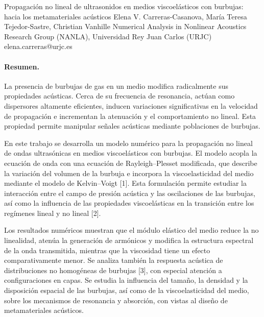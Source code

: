 \documentclass[11pt,a4paper]{article}
\begin{document}
\begin{sincabstract}
{Propagación no lineal de ultrasonidos en medios viscoelásticos con burbujas: hacia los metamateriales acústicos}
{Elena V. Carreras-Casanova, María Teresa Tejedor-Sastre, Christian Vanhille}
{Numerical Analysis in Nonlinear Acoustics Research Group (NANLA), Universidad Rey Juan Carlos (URJC)}
{elena.carreras@urjc.es}

\paragraph{Resumen.}
La presencia de burbujas de gas en un medio modifica radicalmente sus propiedades acústicas. Cerca de su frecuencia de resonancia, actúan como dispersores altamente eficientes, inducen variaciones significativas en la velocidad de propagación e incrementan la atenuación y el comportamiento no lineal. Esta propiedad permite manipular señales acústicas mediante poblaciones de burbujas.

En este trabajo se desarrolla un modelo numérico para la propagación no lineal de ondas ultrasónicas en medios viscoelásticos con burbujas. El modelo acopla la ecuación de onda con una ecuación de Rayleigh--Plesset modificada, que describe la variación del volumen de la burbuja e incorpora la viscoelasticidad del medio mediante el modelo de Kelvin--Voigt [1]. Esta formulación permite estudiar la interacción entre el campo de presión acústica y las oscilaciones de las burbujas, así como la influencia de las propiedades viscoelásticas en la transición entre los regímenes lineal y no lineal [2].

Los resultados numéricos muestran que el módulo elástico del medio reduce la no linealidad, atenúa la generación de armónicos y modifica la estructura espectral de la onda transmitida, mientras que la viscosidad tiene un efecto comparativamente menor. Se analiza también la respuesta acústica de distribuciones no homogéneas de burbujas [3], con especial atención a configuraciones en capas. Se estudia la influencia del tamaño, la densidad y la disposición espacial de las burbujas, así como de la viscoelasticidad del medio, sobre los mecanismos de resonancia y absorción, con vistas al diseño de metamateriales acústicos.



\end{sincabstract}
\end{document}
